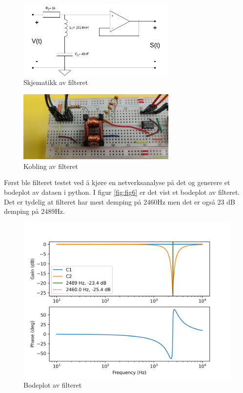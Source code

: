 \begin{figure}[!h]
	\centering
	\includegraphics[width=0.7\textwidth]{Bilder/RLC_filter.drawio.png}
	\caption{Skjematikk av filteret}
	\label{fig:fig5}
\end{figure}

\begin{figure}
	\centering
	\includegraphics[width=0.7\textwidth]{Bilder/Realiser_V1.jpg}
	\caption{Kobling av filteret}
	\label{fig:fig12}
\end{figure}


Først ble filteret testet ved å kjøre en netverksanalyse på det og generere et bodeplot av dataen i python. I figur \autoref{fig:fig6} er det vist et bodeplot av filteret. Det er tydelig at filteret har mest demping på 2460Hz men det er også 23 dB demping på 2489Hz. 

\begin{figure}[!h]
	\centering
	\includegraphics[width=1\textwidth]{Bilder/bode1K.png}
	\caption{Bodeplot av filteret}
	\label{fig:fig6}
\end{figure}

